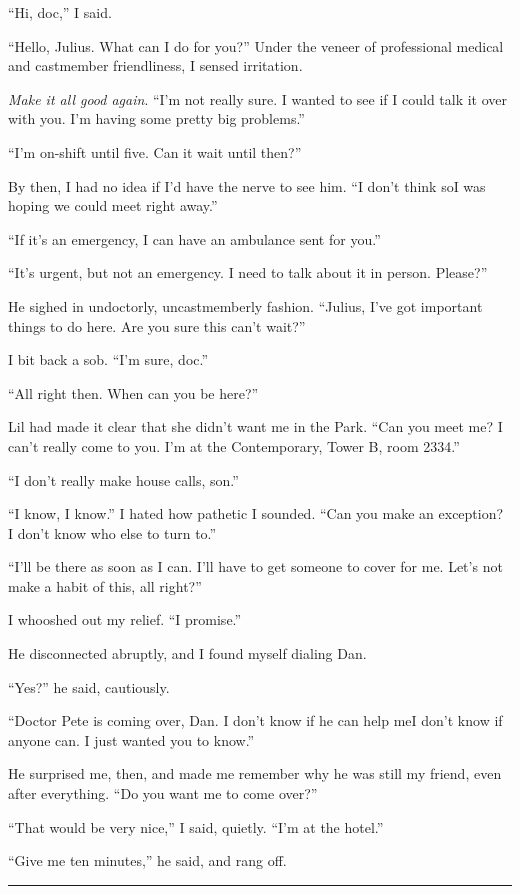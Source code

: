 “Hi, doc,” I said.

“Hello, Julius. What can I do for you?” Under the veneer of
professional medical and castmember friendliness, I sensed
irritation.

\emph{Make it all good again}. “I'm not really sure. I wanted to
see if I could talk it over with you. I'm having some pretty big
problems.”

“I'm on-shift until five. Can it wait until then?”

By then, I had no idea if I'd have the nerve to see him. “I don't
think so{\dash}I was hoping we could meet right away.”

“If it's an emergency, I can have an ambulance sent for you.”

“It's urgent, but not an emergency. I need to talk about it in
person. Please?”

He sighed in undoctorly, uncastmemberly fashion. “Julius, I've got
important things to do here. Are you sure this can't wait?”

I bit back a sob. “I'm sure, doc.”

“All right then. When can you be here?”

Lil had made it clear that she didn't want me in the Park. “Can you
meet me? I can't really come to you. I'm at the Contemporary, Tower
B, room 2334.”

“I don't really make house calls, son.”

“I know, I know.” I hated how pathetic I sounded. “Can you make an
exception? I don't know who else to turn to.”

“I'll be there as soon as I can. I'll have to get someone to cover
for me. Let's not make a habit of this, all right?”

I whooshed out my relief. “I promise.”

He disconnected abruptly, and I found myself dialing Dan.

“Yes?” he said, cautiously.

“Doctor Pete is coming over, Dan. I don't know if he can help me{\dash}I
don't know if anyone can. I just wanted you to know.”

He surprised me, then, and made me remember why he was still my
friend, even after everything. “Do you want me to come over?”

“That would be very nice,” I said, quietly. “I'm at the hotel.”

“Give me ten minutes,” he said, and rang off.

\begin{center}\rule{3in}{0.4pt}\end{center}

